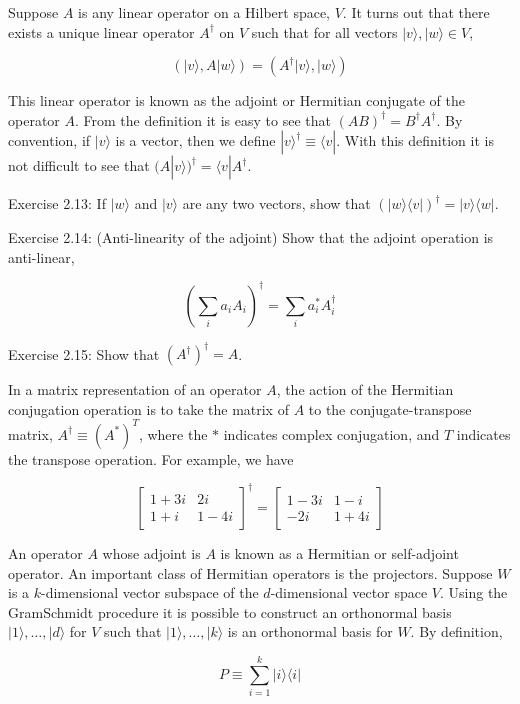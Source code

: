 \documentclass[
	11pt, %
	fleqn, %
	a4paper, %
]{LegrandOrangeBook}
\begin{document}
Suppose $A$ is any linear operator on a Hilbert space, $V$. It turns out that there exists a unique linear operator $A^{\dagger}$ on $V$ such that for all vectors $|v\rangle,|w\rangle \in V$,

$$
(|v\rangle, A|w\rangle)=\left(A^{\dagger}|v\rangle,|w\rangle\right)
$$

This linear operator is known as the adjoint or Hermitian conjugate of the operator $A$. From the definition it is easy to see that $(A B)^{\dagger}=B^{\dagger} A^{\dagger}$. By convention, if $|v\rangle$ is a vector, then we define $|v\rangle^{\dagger} \equiv\langle v|$. With this definition it is not difficult to see that $(A|v\rangle)^{\dagger}=\langle v| A^{\dagger}$.

Exercise 2.13: If $|w\rangle$ and $|v\rangle$ are any two vectors, show that $(|w\rangle\langle v|)^{\dagger}=|v\rangle\langle w|$.

Exercise 2.14: (Anti-linearity of the adjoint) Show that the adjoint operation is anti-linear,

$$
\left(\sum_{i} a_{i} A_{i}\right)^{\dagger}=\sum_{i} a_{i}^{*} A_{i}^{\dagger}
$$

Exercise 2.15: Show that $\left(A^{\dagger}\right)^{\dagger}=A$.

In a matrix representation of an operator $A$, the action of the Hermitian conjugation operation is to take the matrix of $A$ to the conjugate-transpose matrix, $A^{\dagger} \equiv\left(A^{*}\right)^{T}$, where the $*$ indicates complex conjugation, and $T$ indicates the transpose operation. For example, we have

$$
\left[\begin{array}{cc}
1+3 i & 2 i \\
1+i & 1-4 i
\end{array}\right]^{\dagger}=\left[\begin{array}{cc}
1-3 i & 1-i \\
-2 i & 1+4 i
\end{array}\right]
$$

An operator $A$ whose adjoint is $A$ is known as a Hermitian or self-adjoint operator. An important class of Hermitian operators is the projectors. Suppose $W$ is a $k$-dimensional vector subspace of the $d$-dimensional vector space $V$. Using the GramSchmidt procedure it is possible to construct an orthonormal basis $|1\rangle, \ldots,|d\rangle$ for $V$ such that $|1\rangle, \ldots,|k\rangle$ is an orthonormal basis for $W$. By definition,

$$
P \equiv \sum_{i=1}^{k}|i\rangle\langle i|
$$
\end{document}
